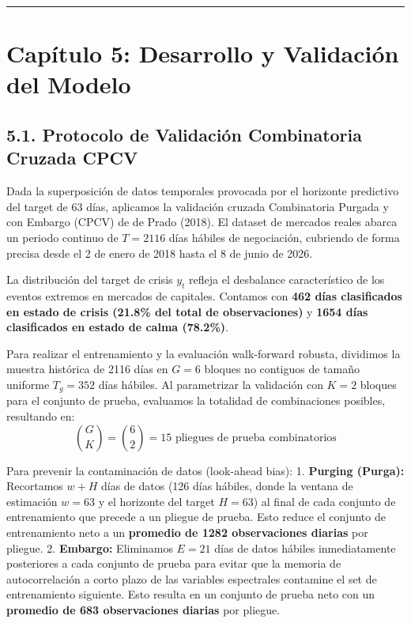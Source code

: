 \documentclass[
  12pt,
]{article}
\begin{document}
\begin{center}\rule{0.5\linewidth}{0.5pt}\end{center}

\section{Capítulo 5: Desarrollo y Validación del
Modelo}\label{capuxedtulo-5-desarrollo-y-validaciuxf3n-del-modelo}

\subsection{5.1. Protocolo de Validación Combinatoria Cruzada
CPCV}\label{protocolo-de-validaciuxf3n-combinatoria-cruzada-cpcv}

Dada la superposición de datos temporales provocada por el horizonte
predictivo del target de 63 días, aplicamos la validación cruzada
Combinatoria Purgada y con Embargo (CPCV) de de Prado (2018). El dataset
de mercados reales abarca un periodo continuo de \(T=2116\) días hábiles
de negociación, cubriendo de forma precisa desde el 2 de enero de 2018
hasta el 8 de junio de 2026.

La distribución del target de crisis \(y_t\) refleja el desbalance
característico de los eventos extremos en mercados de capitales.
Contamos con \textbf{462 días clasificados en estado de crisis (21.8\%
del total de observaciones)} y \textbf{1654 días clasificados en estado
de calma (78.2\%)}.

Para realizar el entrenamiento y la evaluación walk-forward robusta,
dividimos la muestra histórica de 2116 días en \(G=6\) bloques no
contiguos de tamaño uniforme \(T_g = 352\) días hábiles. Al parametrizar
la validación con \(K=2\) bloques para el conjunto de prueba, evaluamos
la totalidad de combinaciones posibles, resultando en:
\[\binom{G}{K} = \binom{6}{2} = 15 \text{ pliegues de prueba combinatorios}\]

Para prevenir la contaminación de datos (look-ahead bias): 1.
\textbf{Purging (Purga):} Recortamos \(w+H\) días de datos (126 días
hábiles, donde la ventana de estimación \(w=63\) y el horizonte del
target \(H=63\)) al final de cada conjunto de entrenamiento que precede
a un pliegue de prueba. Esto reduce el conjunto de entrenamiento neto a
un \textbf{promedio de 1282 observaciones diarias} por pliegue. 2.
\textbf{Embargo:} Eliminamos \(E=21\) días de datos hábiles
inmediatamente posteriores a cada conjunto de prueba para evitar que la
memoria de autocorrelación a corto plazo de las variables espectrales
contamine el set de entrenamiento siguiente. Esto resulta en un conjunto
de prueba neto con un \textbf{promedio de 683 observaciones diarias} por
pliegue.
\end{document}

